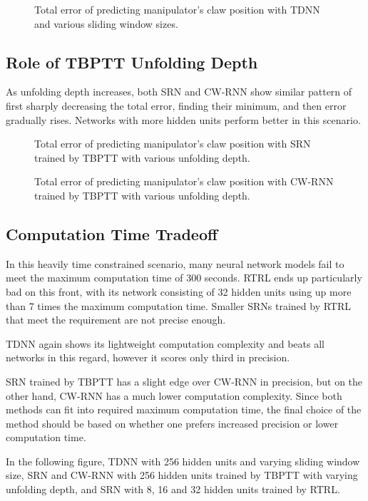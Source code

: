 \documentclass[12pt,oneside]{fithesis2}
\begin{document}
	\begin{figure}[H]
		\caption{Total error of predicting manipulator's claw position with TDNN and various sliding window sizes.}
				
	\end{figure}
	
\subsection{Role of TBPTT Unfolding Depth}
As unfolding depth increases, both SRN and CW-RNN show similar pattern of first sharply decreasing the total error, finding their minimum, and then error gradually rises. Networks with more hidden units perform better in this scenario.

	\begin{figure}[H]
		\caption{Total error of predicting manipulator's claw position with SRN trained by TBPTT with various unfolding depth.}
		
	\end{figure}
	
	\begin{figure}[H]	
		\caption{Total error of predicting manipulator's claw position with CW-RNN trained by TBPTT with various unfolding depth.}
		
	\end{figure}
	
\subsection{Computation Time Tradeoff}
In this heavily time constrained scenario, many neural network models fail to meet the maximum computation time of 300 seconds. RTRL ends up particularly bad on this front, with its network consisting of 32 hidden units using up more than 7 times the maximum computation time. Smaller SRNs trained by RTRL that meet the requirement are not precise enough.\par
TDNN again shows its lightweight computation complexity and beats all networks in this regard, however it scores only third in precision. \par
SRN trained by TBPTT has a slight edge over CW-RNN in precision, but on the other hand, CW-RNN has a much lower computation complexity. Since both methods can fit into required maximum computation time, the final choice of the method should be based on whether one prefers increased precision or lower computation time. \par
In the following figure, TDNN with 256 hidden units and varying sliding window size, SRN and CW-RNN with 256 hidden units trained by TBPTT with varying unfolding depth, and SRN with 8, 16 and 32 hidden units trained by RTRL.
\end{document}
